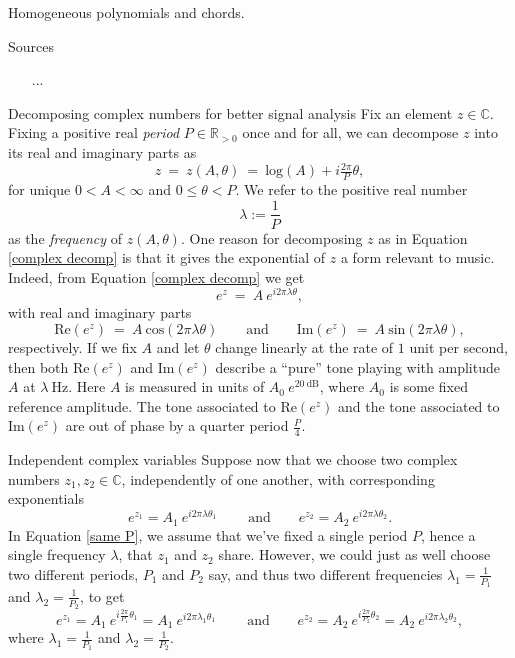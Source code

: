 \documentclass[letterpaper,11pt, reqno]{amsart}
\newtheorem{monodromy theorem}{Monodromy Theorem}[subsection]
\newtheorem{wild conjecture}[theorem]{Wild Conjecture}
\newtheorem{research objectives}{Research objectives}[subsection]
\newtheorem{research question}[theorem]{Research questions}
\newtheorem{aside question}[theorem]{Aside question}
\newtheorem{audio example}[theorem]{\loudspeaker[3] Example}
\newtheorem{blank remark}[theorem]{}
\newtheorem{terminology and comment}[theorem]{Terminology and comment}
\newtheorem{purity hypothesis}[theorem]{Purity hypothesis}
\newtheorem{corollary of the purity hypothesis}[theorem]{Corollary of the purity hypothesis}
\newcommand{\CC} {{\mathbb C}}
\newcommand{\RR} {{\mathbb R}}
\numberwithin{equation}{theorem}
\begin{document}
\begin{section}{Homogeneous polynomials and chords.}

\begin{subsection}{Sources}
	\begin{enumerate}[{\bf\ \ \ \ \ \ 1.}]
	\item
	[...]
	\end{enumerate}
\end{subsection}

\begin{subsection}{Decomposing complex numbers for better signal analysis}
Fix an element $z\in\CC$. Fixing a positive real {\em period} $P\in\RR_{>0}$ once and for all, we can decompose $z$ into its real and imaginary parts as
	\begin{equation}\label{complex decomp}
	z
	\ =\ 
	z(A,\theta)
	\ =\ 
	\text{log}(A)+i\tfrac{2\pi}{P}\theta,
	\end{equation}
for unique $0<A<\infty$ and $0\le \theta<P$. We refer to the positive real number $$\lambda:=\frac{1}{P}$$ as the {\em frequency} of $z(A,\theta)$. One reason for decomposing $z$ as in Equation \eqref{complex decomp} is that it gives the exponential of $z$ a form relevant to music. Indeed, from Equation \eqref{complex decomp} we get
	$$
	e^{z}
	\ =\ 
	A\ \!e^{i2\pi\lambda\theta},
	$$
with real and imaginary parts
	$$
	\text{Re}(e^{z})
	\ =\ 
	A\ \text{cos}(2\pi\lambda\theta)
	\ \ \ \ \ \ \ \ \ \text{and}\ \ \ \ \ \ \ \ \ 
	\text{Im}(e^{z})\ =\ A\ \text{sin}(2\pi\lambda\theta),
	$$
respectively. If we fix $A$ and let $\theta$ change linearly at the rate of $1$ unit per second, then both $\text{Re}(e^{z})$ and $\text{Im}(e^{z})$ describe a ``pure'' tone playing with amplitude $A$ at $\lambda\ \text{Hz}$. Here $A$ is measured in units of $A_0 \ e^{20\ \text{dB}}$, where $A_{0}$ is some fixed reference amplitude. The tone associated to $\text{Re}(e^{z})$ and the tone associated to $\text{Im}(e^{z})$ are out of phase by a quarter period $\frac{P}{4}$.

\end{subsection}

\begin{subsection}{Independent complex variables}
Suppose now that we choose two complex numbers $z_1,z_2\in\CC$, independently of one another, with corresponding exponentials
	\begin{equation}\label{same P}
	e^{z_1}
	=
	A_1\ e^{i2\pi\lambda\theta_1}
	\ \ \ \ \ \ \ \ \ \ \text{and}\ \ \ \ \ \ \ \ \ 
	e^{z_2}
	=
	A_2\ e^{i2\pi\lambda\theta_2}.
	\end{equation}
In Equation \eqref{same P}, we assume that we've fixed a single period $P$, hence a single frequency $\lambda$, that $z_1$ and $z_2$ share. However, we could just as well choose two different periods, $P_1$ and $P_2$ say, and thus two different frequencies $\lambda_1=\tfrac{1}{P_1}$ and $\lambda_2=\tfrac{1}{P_2}$, to get
	$$
	e^{z_1}
	=
	A_1\ e^{i\tfrac{2\pi}{P_1}\theta_1}
	=
	A_1\ e^{i2\pi\lambda_1\theta_1}
	\ \ \ \ \ \ \ \ \ \ \text{and}\ \ \ \ \ \ \ \ \ 
	e^{z_2}
	=
	A_2\ e^{i\tfrac{2\pi}{P_2}\theta_2}
	=
	A_2\ e^{i2\pi\lambda_2\theta_2},
	$$
where $\lambda_1=\tfrac{1}{P_1}$ and $\lambda_2=\tfrac{1}{P_2}$. 


\end{subsection}
\end{section}
\end{document}
